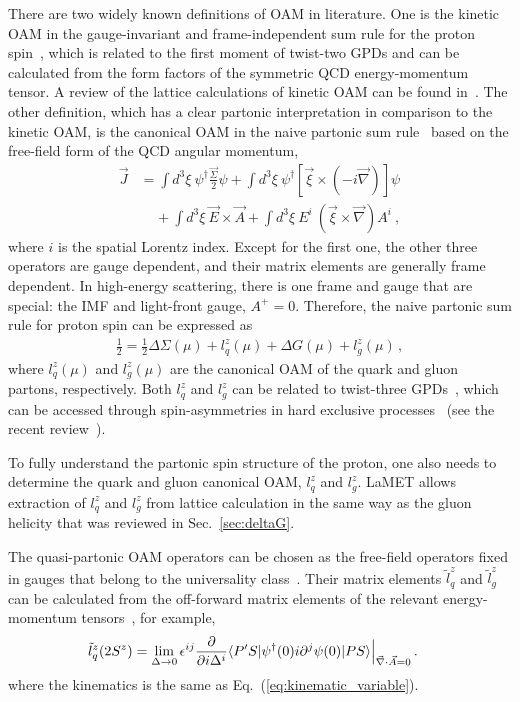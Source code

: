 \documentclass[aps,rmp,reprint,amsmath,amssymb,graphicx,longbibliography]{revtex4-1} %
\newcommand{\beq}{\begin{eqnarray}}
\newcommand{\eeq}{\end{eqnarray}}
\newcommand{\nn}{\nonumber}
\DeclareRobustCommand{\eq}[1]{Eq.~(\ref{eq:#1})}
\DeclareRobustCommand{\sec}[1]{Sec.~\ref{sec:#1}}
\begin{document}
There are two widely known definitions of OAM in literature. One is the kinetic OAM in the gauge-invariant and frame-independent  sum rule for the proton spin~\cite{Ji:1996ek,Ji:1996nm}, which is related to the first moment of twist-two GPDs and can be calculated from the form factors of the symmetric QCD energy-momentum tensor. A review of the lattice calculations of kinetic OAM can be found in~\cite{Ji:2020ena}. The other definition, which has a clear partonic interpretation in comparison to the kinetic OAM, is the canonical OAM in the naive partonic sum rule~\cite{Jaffe:1989jz} based on the free-field form of the QCD angular momentum,
\begin{align}\label{eq:jmam}
	\vec{J} &= \int d^3\xi\ \psi^\dagger \frac{\vec{\Sigma}}{2} \psi + \int d^3\xi\ \psi^\dagger\left[\vec{\xi}\times (-i\vec{\nabla} )\right]\psi \nn\\
	&\ \ \ \ \ + \int d^3\xi\ \vec{E}\times\vec{A} + \int d^3\xi\ E^i\ \left(\vec{\xi}\times\vec{\nabla}\right) A^{i} \ ,
\end{align}
where $i$ is the spatial Lorentz index. Except for the first one,
the other three operators are gauge dependent, and their matrix elements are
generally frame dependent. In high-energy scattering, there is one frame and
gauge that are special: the IMF and light-front gauge, $A^+=0$.
Therefore, the naive partonic sum rule for proton spin can be expressed as~\cite{Jaffe:1989jz}
\beq\label{eq:jm}
\frac{1}{2}= \frac{1}{2}\Delta \Sigma(\mu)  + l^z_q(\mu) + \Delta G(\mu) + l^z_g(\mu) \,,
\eeq
where $l^z_q(\mu)$ and $l^z_g(\mu)$ are the canonical
OAM of the quark and gluon partons, respectively.
Both $l_q^z$ and $l_g^z$ can be related to twist-three GPDs~\cite{Hatta:2011ku,Ji:2012ba,Hatta:2012cs}, which can be accessed through spin-asymmetries in hard exclusive processes~\cite{Ji:2016jgn,Hatta:2016aoc,Bhattacharya:2017bvs,Bhattacharya:2018lgm} (see the recent review~\cite{Ji:2020ena}).

To fully understand the partonic spin structure of the proton,
one also needs to determine the quark and gluon canonical OAM, $l^z_q$ and $l^z_g$.
LaMET allows extraction of $l_q^z$ and $l_g^z$ from lattice calculation in the same way as the gluon helicity that was reviewed in \sec{deltaG}.

The quasi-partonic OAM operators can be chosen as the free-field operators fixed in gauges that
belong to the universality class~\cite{Hatta:2013gta}.
Their matrix elements $\tilde l^z_q$ and $\tilde l^z_g$ can be calculated from the off-forward matrix elements of the relevant energy-momentum tensors~\cite{Zhao:2015kca}, for example,
\begin{align}
	\tilde l^z_q(2S^z) &= \lim_{\Delta\to0} \epsilon^{ij}{\partial \over \partial i\Delta^i}\langle P'S| \psi^\dagger (0) i\partial^j \psi(0)|PS\rangle \Big|_{\vec{\nabla}\cdot \vec{A}=0}\,.
\end{align}
where the kinematics is the same as \eq{kinematic_variable}.
\end{document}
